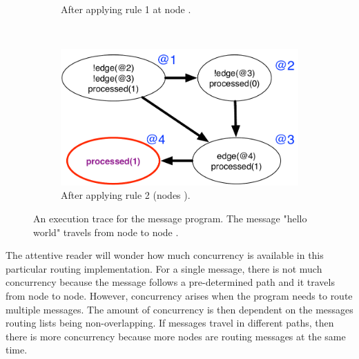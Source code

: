 \begin{figure}[h]
\begin{subfigure}[b]{\visitsize\textwidth}
                \caption{After applying rule 1 at node .}
                \label{fig:message_trace3}
        \end{subfigure}%
        ~
        \begin{subfigure}[b]{\visitsize\textwidth}
                  \includegraphics[width=\textwidth]{figures/message/message_trace4}
                  \caption{After applying rule 2 (nodes ).}
                  \label{fig:message_trace4}
          \end{subfigure}
        \caption{An execution trace for the message program. The message "hello
        world" travels from node  to node .}\label{fig:message_trace}
\end{figure}

The attentive reader will wonder how much concurrency is available in this
particular routing implementation. For a single message, there is not much
concurrency because the message follows a pre-determined path and it travels
from node to node. However, concurrency arises when the program needs to route
multiple messages. The amount of concurrency is then dependent on the messages
routing lists being non-overlapping. If messages travel in different paths, then
there is more concurrency because more nodes are routing messages at the same
time.
